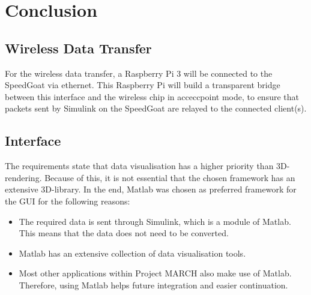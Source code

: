 \section{Conclusion}
\subsection{Wireless Data Transfer}
For the wireless data transfer, a Raspberry Pi 3 will be connected to the SpeedGoat via ethernet. This Raspberry Pi will build a transparent bridge between this interface and the wireless chip in acceccpoint mode, to ensure that packets sent by Simulink on the SpeedGoat are relayed to the connected client(s).
\subsection{Interface}
The requirements state that data visualisation has a higher priority than 3D-rendering. Because of this, it is not essential that the chosen framework has an extensive 3D-library. In the end, Matlab was chosen as preferred framework for the GUI for the following reasons:
\begin{itemize}
	\item The required data is sent through Simulink, which is a module of Matlab. This means that the data does not need to be converted.
	\item Matlab has an extensive collection of data visualisation tools.
	\item Most other applications within Project MARCH also make use of Matlab. Therefore, using Matlab helps future integration and easier continuation.
\end{itemize}